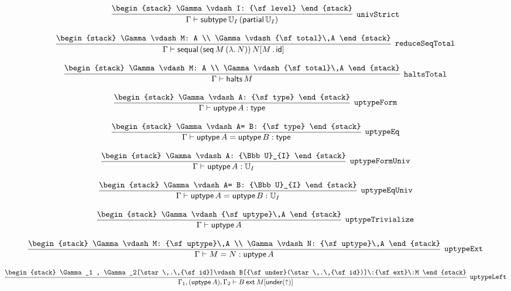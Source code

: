 \[
\infer[{\tt univStrict}]{\Gamma \vdash {\sf subtype}\,{\Bbb U}_{I}\,({\sf partial}\,{\Bbb U}_{I})}{
\begin{stack}
\Gamma \vdash I: {\sf level}
\end{stack}}
\]

\[
\infer[{\tt reduceSeqTotal}]{\Gamma \vdash {\sf sequal}\,({\sf seq}\,M\,(\lambda .\,N))\,N[M\,.\,{\sf id}]}{
\begin{stack}
\Gamma \vdash M: A
\\
\Gamma \vdash {\sf total}\,A
\end{stack}}
\]

\[
\infer[{\tt haltsTotal}]{\Gamma \vdash {\sf halts}\,M}{
\begin{stack}
\Gamma \vdash M: A
\\
\Gamma \vdash {\sf total}\,A
\end{stack}}
\]

\[
\infer[{\tt uptypeForm}]{\Gamma \vdash {\sf uptype}\,A: {\sf type}}{
\begin{stack}
\Gamma \vdash A: {\sf type}
\end{stack}}
\]

\[
\infer[{\tt uptypeEq}]{\Gamma \vdash {\sf uptype}\,A= {\sf uptype}\,B: {\sf type}}{
\begin{stack}
\Gamma \vdash A= B: {\sf type}
\end{stack}}
\]

\[
\infer[{\tt uptypeFormUniv}]{\Gamma \vdash {\sf uptype}\,A: {\Bbb U}_{I}}{
\begin{stack}
\Gamma \vdash A: {\Bbb U}_{I}
\end{stack}}
\]

\[
\infer[{\tt uptypeEqUniv}]{\Gamma \vdash {\sf uptype}\,A= {\sf uptype}\,B: {\Bbb U}_{I}}{
\begin{stack}
\Gamma \vdash A= B: {\Bbb U}_{I}
\end{stack}}
\]

\[
\infer[{\tt uptypeTrivialize}]{\Gamma \vdash {\sf uptype}\,A}{
\begin{stack}
\Gamma \vdash {\sf uptype}\,A
\end{stack}}
\]

\[
\infer[{\tt uptypeExt}]{\Gamma \vdash M= N: {\sf uptype}\,A}{
\begin{stack}
\Gamma \vdash M: {\sf uptype}\,A
\\
\Gamma \vdash N: {\sf uptype}\,A
\end{stack}}
\]

\[
\infer[{\tt uptypeLeft}]{\Gamma_1 ,({\sf uptype}\,A), \Gamma_2 \vdash B\:{\sf ext}\:M[{\sf under}(\uparrow )]}{
\begin{stack}
\Gamma_1 , \Gamma_2[\star \,.\,{\sf id}]\vdash B[{\sf under}(\star \,.\,{\sf id})]\:{\sf ext}\:M
\end{stack}}
\]

